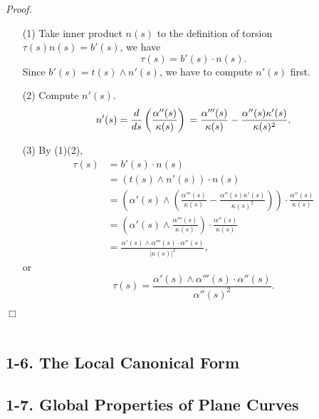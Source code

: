 \documentclass{article}
\begin{document}
\emph{Proof.}
\begin{enumerate}
\item[(1)]
  Take inner product $n(s)$
  to the definition of torsion $\tau(s) n(s) = b'(s)$,
  we have $$\tau(s) = b'(s) \cdot n(s).$$
  Since $b'(s) = t(s) \wedge n'(s)$, we have to compute $n'(s)$ first.
\item[(2)]
  Compute $n'(s)$.
  $$n'(s)
  = \frac{d}{ds} \left( \frac{\alpha''(s)}{\kappa(s)} \right) \\
  = \frac{\alpha'''(s)}{\kappa(s)} - \frac{\alpha''(s)\kappa'(s)}{\kappa(s)^2}.$$
\item[(3)]
  By (1)(2),
  \begin{align*}
  \tau(s)
  &= b'(s) \cdot n(s) \\
  &= (t(s) \wedge n'(s)) \cdot n(s) \\
  &= \left(
    \alpha'(s)
      \wedge
    \left(
      \frac{\alpha'''(s)}{\kappa(s)}
      - \frac{\alpha''(s)\kappa'(s)}{\kappa(s)^2}
    \right)
  \right)
  \cdot \frac{\alpha''(s)}{\kappa(s)} \\
  &= \left(
    \alpha'(s) \wedge \frac{\alpha'''(s)}{\kappa(s)}
  \right)
  \cdot \frac{\alpha''(s)}{\kappa(s)} \\
  &= \frac{\alpha'(s) \wedge \alpha'''(s) \cdot \alpha''(s)}{|\kappa(s)|^2},
  \end{align*}
  or
  $$\tau(s) = \frac{\alpha'(s) \wedge \alpha'''(s) \cdot \alpha''(s)}{\alpha''(s)^2}.$$
\end{enumerate}
$\Box$ \\\\






\subsection*{1-6. The Local Canonical Form \\}






\subsection*{1-7. Global Properties of Plane Curves \\}



\end{document}
